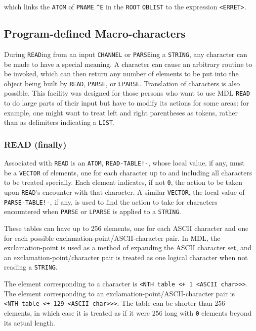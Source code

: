 \documentclass[a4paper]{scrbook}
\begin{document}
which links the \texttt{ATOM} of \texttt{PNAME} \texttt{\^{}E} in the \texttt{ROOT} \texttt{OBLIST} to the expression
\texttt{\textless{}ERRET\textgreater{}}.

\subsection{Program-defined Macro-characters}\label{program-defined-macro-characters}

During \texttt{READ}ing from an input \texttt{CHANNEL} or \texttt{PARSE}ing a \texttt{STRING}, any character can be made to
have a special meaning. A character can cause an arbitrary routine to be invoked, which can then return any number of
elements to be put into the object being built by \texttt{READ}, \texttt{PARSE}, or
\texttt{LPARSE}. Translation of characters is also possible. This facility was designed for those
persons who want to use MDL \texttt{READ} to do large parts of their input but have to modify its actions for some areas:
for example, one might want to treat left and right parentheses as tokens, rather than as delimiters indicating a
\texttt{LIST}.

\subsubsection{READ (finally)}\label{read-finally}

 Associated with \texttt{READ} is an \texttt{ATOM},
\texttt{READ-TABLE!-}, whose local value, if any, must be a \texttt{VECTOR} of elements,
one for each character up to and including all characters to be treated specially. Each element indicates, if not
\texttt{0}, the action to be taken upon \texttt{READ}'s encounter with that character. A similar \texttt{VECTOR}, the local
value of \texttt{PARSE-TABLE!-}, if any, is used to find the action to take for
characters encountered when \texttt{PARSE} or \texttt{LPARSE} is applied to a \texttt{STRING}.

These tables can have up to 256 elements, one for each ASCII character and one for each possible
exclamation-point/ASCII-character pair. In MDL, the exclamation-point is used as a method of expanding the ASCII character
set, and an exclamation-point/character pair is treated as one logical character when not reading a \texttt{STRING}.

The element corresponding to a character is
\texttt{\textless{}NTH\ table\ \textless{}+\ 1\ \textless{}ASCII\ char\textgreater{}\textgreater{}\textgreater{}}. The
element corresponding to an exclamation-point/ASCII-character pair is
\texttt{\textless{}NTH\ table\ \textless{}+\ 129\ \textless{}ASCII\ char\textgreater{}\textgreater{}\textgreater{}}. The
table can be shorter than 256 elements, in which case it is treated as if it were 256 long with \texttt{0} elements beyond
its actual length.
\end{document}
